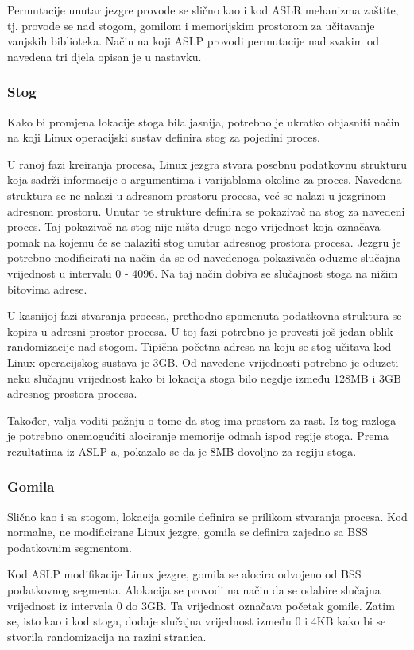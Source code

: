 \documentclass[times, utf8, diplomski, numeric]{fer}
\begin{document}
Permutacije unutar jezgre provode se slično kao i kod ASLR
mehanizma zaštite, tj. provode se nad stogom, gomilom i
memorijskim prostorom za učitavanje vanjskih biblioteka. Način na
koji ASLP provodi permutacije nad svakim od navedena tri djela
opisan je u nastavku.

\subsubsection{Stog}

Kako bi promjena lokacije stoga bila jasnija, potrebno je ukratko
objasniti način na koji Linux operacijski sustav definira stog za
pojedini proces. 

U ranoj fazi kreiranja procesa, Linux jezgra stvara posebnu
podatkovnu strukturu koja sadrži informacije o argumentima i
varijablama okoline za proces. Navedena struktura se ne nalazi u
adresnom prostoru procesa, već se nalazi u jezgrinom adresnom
prostoru. Unutar te strukture definira se pokazivač na stog za
navedeni proces. Taj pokazivač na stog nije ništa drugo nego
vrijednost koja označava pomak na kojemu će se nalaziti stog
unutar adresnog prostora procesa. Jezgru je potrebno modificirati
na način da se od navedenoga pokazivača oduzme slučajna
vrijednost u intervalu 0 - 4096. Na taj način dobiva se
slučajnost stoga na nižim bitovima adrese.

U kasnijoj fazi stvaranja procesa, prethodno spomenuta podatkovna
struktura se kopira u adresni prostor procesa. U toj fazi
potrebno je provesti još jedan oblik randomizacije nad stogom.
Tipična početna adresa na koju se stog učitava kod Linux
operacijskog sustava je 3GB. Od navedene vrijednosti potrebno je
oduzeti neku slučajnu vrijednost kako bi lokacija stoga bilo
negdje između 128MB i 3GB adresnog prostora procesa.

Također, valja voditi pažnju o tome da stog ima prostora za rast.
Iz tog razloga je potrebno onemogućiti alociranje memorije odmah
ispod regije stoga. Prema rezultatima iz ASLP-a, pokazalo se da
je 8MB dovoljno za regiju stoga.

\subsubsection{Gomila}

Slično kao i sa stogom, lokacija gomile definira se prilikom
stvaranja procesa. Kod normalne, ne modificirane Linux jezgre,
gomila se definira zajedno sa BSS podatkovnim segmentom. 

Kod ASLP modifikacije Linux jezgre, gomila se alocira odvojeno od
BSS podatkovnog segmenta. Alokacija se provodi na način da se
odabire slučajna vrijednost iz intervala 0 do 3GB. Ta vrijednost
označava početak gomile. Zatim se, isto kao i kod stoga, dodaje
slučajna vrijednost između 0 i 4KB kako bi se stvorila
randomizacija na razini stranica.
\end{document}
